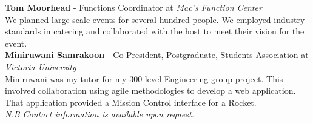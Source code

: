 \documentclass[9pt]{developercv}
\begin{document}
\textbf{Tom Moorhead} - Functions Coordinator at \emph{Mac's Function Center} \\
We planned large scale events for several hundred people. We employed industry standards in catering and collaborated with the host to meet their vision for the event. \\

\textbf{Miniruwani Samrakoon} - Co-President, Postgraduate, Students Association at \emph{Victoria University} \\
Miniruwani was my tutor for my 300 level Engineering group project. This involved collaboration using agile methodologies to develop a web application. That application provided a Mission Control interface for a Rocket. \\

\emph{N.B Contact information is available upon request.}





\end{document}
